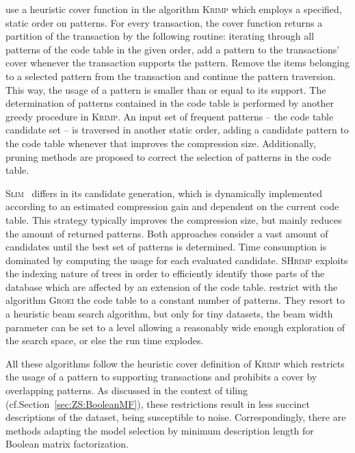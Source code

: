 \cite{siebes2006item} use a heuristic cover function in the algorithm \textsc{Krimp} which employs a specified, static order on patterns. For every transaction, the cover function returns a partition of the transaction by the following routine: iterating through all patterns of the code table in the given order, add a pattern to the transactions' cover whenever the transaction supports the pattern. Remove the items belonging to a selected pattern from the transaction and continue the pattern traversion. This way, the usage of a pattern is smaller than or equal to its support.
The determination of patterns contained in the code table is performed by another greedy procedure in \textsc{Krimp}. An input set of frequent patterns -- the code table candidate set -- is traversed in another static order, adding a candidate pattern to the code table whenever that improves the compression size. Additionally, pruning methods are proposed to correct the selection of patterns in the code table.

\textsc{Slim}~\citep{smets2012slim} differs in its candidate generation, which is   dynamically implemented according to an estimated compression gain and dependent on the current code table. This strategy typically improves the compression size, but mainly reduces  the  amount of returned patterns.  
Both approaches consider a vast amount of candidates until the best set of patterns is determined. Time consumption is dominated by computing the usage for each evaluated candidate.
\textsc{SHrimp} \citep{hess2014shrimp} exploits the indexing nature of trees in order to efficiently identify those parts of the database which are affected by an extension of the code table.
\cite{siebes2011structure} restrict with the algorithm \textsc{Groei} the code table to a constant number of patterns. They resort to a heuristic beam search algorithm,
but only for tiny datasets, the beam width parameter can be set to a level allowing a reasonably wide enough exploration of the search space, or else the run time explodes.

All these algorithms follow the heuristic cover definition of \textsc{Krimp} which restricts the usage of a pattern to supporting transactions and prohibits a cover by overlapping patterns. As discussed in the context of tiling (cf.\@ Section~\ref{sec:ZS:BooleanMF}), these restrictions result in less succinct descriptions of the dataset, being susceptible to noise. Correspondingly, there are methods adapting the model selection by minimum description length for Boolean matrix factorization.
